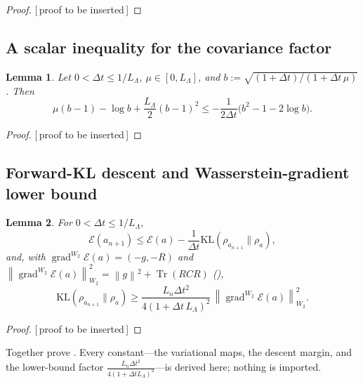 \documentclass[11pt]{article}
\theoremstyle{plain}
\newtheorem{lemma}[lemma]{Lemma}
\theoremstyle{definition}
\theoremstyle{remark}
\newcommand{\KL}{\mathrm{KL}}
\newcommand{\Tr}{\operatorname{Tr}}
\newcommand{\grad}{\operatorname{grad}}
\newcommand{\calE}{\mathcal{E}}
\newcommand{\norm}[1]{\left\lVert #1\right\rVert}
\newcommand{\LB}{L_\Lambda}
\newcommand{\PROOFHOLE}{{\color{red}\textsf{[\,proof to be inserted\,]}}}
\begin{document}
\begin{proof}
\PROOFHOLE
\end{proof}

\subsection{A scalar inequality for the covariance factor}
\label{app:KL-scalar}

\begin{lemma}
\label{lem:scalar-KL}
Let $0<\Delta t\leq1/\LB$, $\mu\in[0,\LB]$, and $b:=\sqrt{(1+\Delta t)/(1+\Delta t\,\mu)}$. Then
\begin{equation}
\label{eq:scalar-KL}
    \mu(b-1)-\log b+\frac{\LB}2(b-1)^2\leq-\frac1{2\Delta t}\bigl(b^2-1-2\log b\bigr).
\end{equation}
\end{lemma}

\begin{proof}
\PROOFHOLE
\end{proof}

\subsection{Forward-KL descent and Wasserstein-gradient lower bound}
\label{app:KL-descent}

\begin{lemma}
\label{lem:KL-onestep-app}
For $0<\Delta t\leq1/\LB$,
\begin{equation}
\label{eq:KL-descent-app}
    \calE(a_{n+1})\leq\calE(a)-\frac1{\Delta t}\KL(\rho_{a_{n+1}}\|\rho_a),
\end{equation}
and, with $\grad^{W_2}\calE(a)=(-g,-R)$ and
$\norm{\grad^{W_2}\calE(a)}_{W_2}^2=\norm g^2+\Tr(RCR)$ (),
\begin{equation}
\label{eq:KL-lower}
    \KL(\rho_{a_{n+1}}\|\rho_a)\geq\frac{L_n\Delta t^2}{4(1+\Delta t\,\LB)^2}\,\norm{\grad^{W_2}\calE(a)}_{W_2}^2 .
\end{equation}
\end{lemma}

\begin{proof}
\PROOFHOLE
\end{proof}

Together  prove . Every
constant---the variational maps, the descent margin, and the lower-bound factor
$\tfrac{L_n\Delta t^2}{4(1+\Delta t\LB)^2}$---is derived here; nothing is imported.
\end{document}
